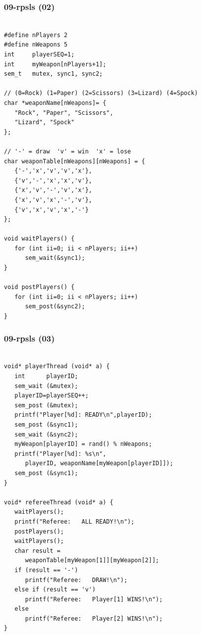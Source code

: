\documentclass[aspectratio=169, xcolor=table, notheorems, hyperref={pdfpagelabels=false}]{beamer}
\begin{document}
\begin{frame}[fragile]
\frametitle{09-rpsls (02)}
\begin{lstlisting}[basicstyle=\ttfamily\tiny]

#define nPlayers 2
#define nWeapons 5
int     playerSEQ=1;
int     myWeapon[nPlayers+1];
sem_t   mutex, sync1, sync2;

// (0=Rock) (1=Paper) (2=Scissors) (3=Lizard) (4=Spock)
char *weaponName[nWeapons]= {
   "Rock", "Paper", "Scissors", 
   "Lizard", "Spock"
};

// '-' = draw  'v' = win  'x' = lose
char weaponTable[nWeapons][nWeapons] = {
   {'-','x','v','v','x'},
   {'v','-','x','x','v'},
   {'x','v','-','v','x'},
   {'x','v','x','-','v'},
   {'v','x','v','x','-'}
};

void waitPlayers() {
   for (int ii=0; ii < nPlayers; ii++)
      sem_wait(&sync1);
}

void postPlayers() {
   for (int ii=0; ii < nPlayers; ii++)
      sem_post(&sync2);
}

\end{lstlisting}
\end{frame}

\begin{frame}[fragile]
\frametitle{09-rpsls (03)}
\begin{lstlisting}[basicstyle=\ttfamily\tiny]

void* playerThread (void* a) {
   int      playerID;
   sem_wait (&mutex);
   playerID=playerSEQ++;
   sem_post (&mutex);
   printf("Player[%d]: READY\n",playerID);
   sem_post (&sync1);
   sem_wait (&sync2);
   myWeapon[playerID] = rand() % nWeapons;
   printf("Player[%d]: %s\n", 
      playerID, weaponName[myWeapon[playerID]]);
   sem_post (&sync1);
}

void* refereeThread (void* a) {
   waitPlayers();
   printf("Referee:   ALL READY!\n");
   postPlayers();
   waitPlayers();
   char result = 
      weaponTable[myWeapon[1]][myWeapon[2]];
   if (result == '-') 
      printf("Referee:   DRAW!\n");
   else if (result == 'v')
      printf("Referee:   Player[1] WINS!\n");
   else
      printf("Referee:   Player[2] WINS!\n");
}

\end{lstlisting}
\end{frame}
\end{document}
